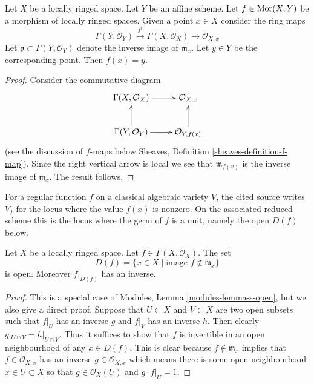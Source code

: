 \begin{lemma}
\label{lemma-morphism-into-affine-where-point-goes}
Let $X$ be a locally ringed space.
Let $Y$ be an affine scheme.
Let $f \in \mathop{\mathrm{Mor}}\nolimits(X, Y)$ be a morphism
of locally ringed spaces. Given a point $x \in X$
consider the ring maps
$$
\Gamma(Y, \mathcal{O}_Y) \xrightarrow{f^\sharp}
\Gamma(X, \mathcal{O}_X) \to \mathcal{O}_{X, x}
$$
Let $\mathfrak p \subset \Gamma(Y, \mathcal{O}_Y)$ denote
the inverse image of $\mathfrak m_x$. Let $y \in Y$ be the
corresponding point. Then $f(x) = y$.
\end{lemma}

\begin{proof}
Consider the commutative diagram
$$
\xymatrix{
\Gamma(X, \mathcal{O}_X) \ar[r] &
\mathcal{O}_{X, x} \\
\Gamma(Y, \mathcal{O}_Y) \ar[r] \ar[u] &
\mathcal{O}_{Y, f(x)} \ar[u]
}
$$
(see the discussion of $f$-maps below
Sheaves, Definition \ref{sheaves-definition-f-map}).
Since the right vertical arrow is local
we see that $\mathfrak m_{f(x)}$ is the
inverse image of $\mathfrak m_x$. The result
follows.
\end{proof}

\begin{lemma}
\label{lemma-f-open}
\begin{reference}
\cite[Chapter II, \S 3, no. 42, p. 234]{FAC}
\end{reference}
\begin{history}
For a regular function $f$ on a classical algebraic variety $V$, the cited
source writes $V_f$ for the locus where the value $f(x)$ is nonzero. On the
associated reduced scheme this is the locus where the germ of $f$ is a unit,
namely the open $D(f)$ below.
\end{history}
Let $X$ be a locally ringed space.
Let $f \in \Gamma(X, \mathcal{O}_X)$.
The set
$$
D(f) = \{x \in X \mid \text{image }f \not\in \mathfrak m_x\}
$$
is open. Moreover $f|_{D(f)}$ has an inverse.
\end{lemma}

\begin{proof}
This is a special case of Modules, Lemma \ref{modules-lemma-s-open}, but
we also give a direct proof.
Suppose that $U \subset X$ and $V \subset X$ are
two open subsets such that $f|_U$ has an inverse
$g$ and $f|_V$ has an inverse $h$. Then clearly
$g|_{U\cap V} = h|_{U\cap V}$. Thus it suffices
to show that $f$ is invertible in an open neighbourhood
of any $x \in D(f)$. This is clear because
$f \not \in \mathfrak m_x$ implies that $f \in \mathcal{O}_{X, x}$
has an inverse $g \in \mathcal{O}_{X, x}$ which means there
is some open neighbourhood $x \in U \subset X$ so
that $g \in \mathcal{O}_X(U)$ and $g\cdot f|_U = 1$.
\end{proof}

